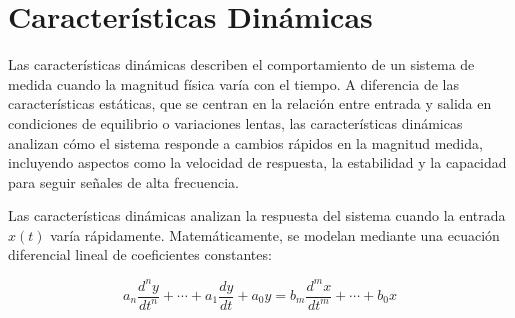 \section{Características Dinámicas}\label{sec:caract_dinamicas} 

Las características dinámicas describen el comportamiento de un sistema de medida cuando la magnitud física varía con el tiempo. A diferencia de las características estáticas, que se centran en la relación entre entrada y salida en condiciones de equilibrio o variaciones lentas, las características dinámicas analizan cómo el sistema responde a cambios rápidos en la magnitud medida, incluyendo aspectos como la velocidad de respuesta, la estabilidad y la capacidad para seguir señales de alta frecuencia.

Las características dinámicas analizan la respuesta del sistema cuando la entrada $x(t)$ varía rápidamente. Matemáticamente, se modelan mediante una ecuación diferencial lineal de coeficientes constantes:

\begin{equation}
    a_n \frac{d^n y}{dt^n} + \cdots + a_1 \frac{dy}{dt} + a_0 y = b_m \frac{d^m x}{dt^m} + \cdots + b_0 x
\end{equation}

